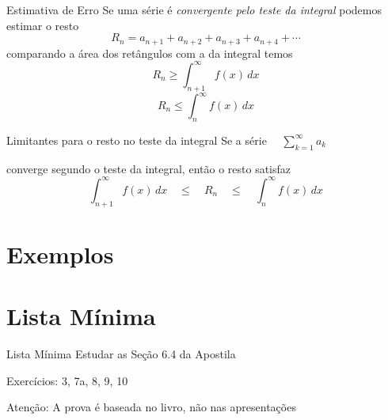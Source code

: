\documentclass[fleqn,utf8,aspectratio=169,12pt]{beamer}
\begin{document}
\begin{frame}{Estimativa de Erro}
  Se uma série é \emph{convergente pelo teste da integral} podemos estimar o resto
  \[ R_n = a_{n+1} + a_{n+2} + a_{n+3} + a_{n+4} + \cdots \]
  \pause
  comparando a área dos retângulos com a da integral temos
  \pause
  \[ R_n \geq \int_{n+1}^{\infty} f(x)\,dx \]
  \pause
  \[ R_n \leq \int_{n}^{\infty} f(x)\,dx \]
\end{frame}

\begin{frame}{Limitantes para o resto no teste da integral}
  Se a série
  \(
    \quad \sum_{k=1}^{\infty} a_k
  \)

  \vspace{0.5\baselineskip}
  converge segundo o teste da integral, então o resto satisfaz
  \[
    \int_{n+1}^{\infty} f(x)\,dx
    \quad\leq\quad
    R_n
    \quad\leq\quad
    \int_{n}^{\infty} f(x)\,dx
  \]
\end{frame}

\section{Exemplos}



\section{Lista Mínima}

\begin{frame}{Lista Mínima}
  Estudar as Seção 6.4 da Apostila

  \vspace{\baselineskip}
  Exercícios: 3, 7a, 8, 9, 10

  \vfill
  Atenção: A prova é baseada no livro, não nas apresentações
\end{frame}

\end{document}
